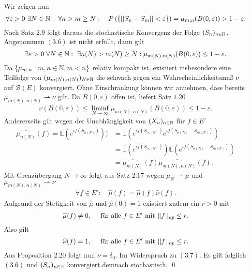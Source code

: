 \begin{proof*}
    Wir zeigen nun
    \begin{align}
        \forall \varepsilon > 0 \ \exists N \in \mathbb{N}: \ \forall n > m \geq N: \quad P\left(\left\{ \lvert\lvert S_n - S_m \rvert\rvert < \varepsilon \right\}\right) = \mu_{m,n}(B(0,\varepsilon)) > 1 - \varepsilon.
    \end{align}
    Nach Satz $2.9$ folgt daraus die stochastische Konvergenz der Folge $(S_n)_{n \in \mathbb{N}}$. Angenommen $(3.6)$ ist nicht erfüllt, dann gilt
    \begin{align*}
        \exists \varepsilon > 0 \ \forall N \in \mathbb{N}: \ \exists n(N) > m(N) \geq N: \mu_{m(N), n(N)}(B(0, \varepsilon)) \leq 1 - \varepsilon.
    \end{align*}
    Da $\{\mu_{m,n}: m,n \in \mathbb{N}, m < n \}$ relativ kompakt ist, existiert insbesondere eine Teilfolge von $(\mu_{m(N),n(N)})_{N \in \mathbb{N}}$ die schwach gegen ein Wahrscheinlichkeitsmaß $\nu$ auf $\mathcal{B}(E)$ konvergiert.
    Ohne Einschränkung können wir annehmen, dass bereits $\mu_{m(N),n(N)} \rightharpoonup \nu$ gilt. Da $B(0, \varepsilon)$ offen ist, liefert Satz $1.20$
    \begin{align}
        \nu(B(0, \varepsilon)) \leq \liminf_{N \to \infty}\mu_{m(N),n(N)}(B(0,\varepsilon)) \leq 1 - \varepsilon. 
    \end{align}
    Andererseits gilt wegen der Unabhängigkeit von $(X_n)_{n \in \mathbb{N}}$ für $f \in E'$
    \begin{align*}
        \widehat{\mu_{n(N)}}(f) = \mathbb{E}(e^{if(S_{n(N)})})) &= \mathbb{E}(e^{if(S_{m(N)})}e^{if(S_{n(N)} - S_{m(N)})}) \\\
                                                   &= \mathbb{E}(e^{if(S_{m(N)})})\mathbb{E}(e^{if(S_{n(N)} - S_{m(N)})}) \\\
                                                   &= \widehat{\mu_{m(N)}}(f)\widehat{\mu_{m(N),n(N)}}(f). 
    \end{align*}
    Mit Grenzübergang $N \to \infty$ folgt aus Satz $2.17$ wegen $\mu_N \rightharpoonup \mu$ und $\mu_{m(N),n(N)} \rightharpoonup \nu$ 
    \begin{align*}
        \forall f \in E': \quad \widehat{\mu}(f) = \widehat{\mu}(f) \widehat{\nu}(f).
    \end{align*}
    Aufgrund der Stetigkeit von $\widehat{\mu}$ und $\widehat{\mu}(0) = 1$ existiert zudem ein $r>0$ mit 
    \begin{align*}
        \widehat{\mu}(f) \neq 0, \quad \text{ für alle } f \in E' \text{ mit } \lvert\lvert f \rvert\rvert_{op} \leq r. 
    \end{align*}
    Also gilt 
    \begin{align*}
        \widehat{\nu}(f) = 1, \quad \text{ für alle } f \in E' \text{ mit } \lvert\lvert f \rvert\rvert_{op} \leq r. 
    \end{align*}
    Aus Proposition $2.20$ folgt nun $\nu = \delta_0$. Im Widerspruch zu $(3.7)$. Es gilt folglich $(3.6)$ und $(S_n)_{n \in \mathbb{N}}$ konvergiert demnach stochastisch. 
    \qed
\end{proof*}

